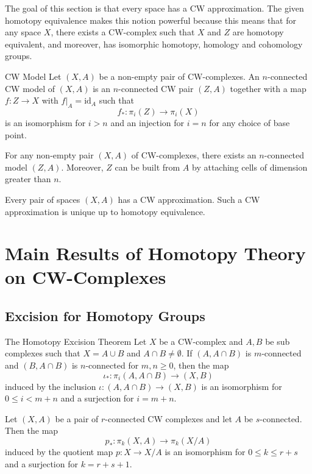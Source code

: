\documentclass[a4paper]{article}
\begin{document}
The goal of this section is that every space has a CW approximation. The given homotopy equivalence makes this notion powerful because this means that for any space $X$, there exists a CW-complex such that $X$ and $Z$ are homotopy equivalent, and moreover, has isomorphic homotopy, homology and cohomology groups. 

\begin{defn}{CW Model}{} Let $(X,A)$ be a non-empty pair of CW-complexes. An $n$-connected CW model of $(X,A)$ is an $n$-connected CW pair $(Z,A)$ together with a map $f:Z\to X$ with $f|_A=\text{id}_A$ such that $$f_\ast:\pi_i(Z)\to\pi_i(X)$$ is an isomorphism for $i>n$ and an injection for $i=n$ for any choice of base point. 
\end{defn}

\begin{thm}{}{} For any non-empty pair $(X,A)$ of CW-complexes, there exists an $n$-connected model $(Z,A)$. Moreover, $Z$ can be built from $A$ by attaching cells of dimension greater than $n$. 
\end{thm}

\begin{thm}{}{} Every pair of spaces $(X,A)$ has a CW approximation. Such a CW approximation is unique up to homotopy equivalence. 
\end{thm}

\pagebreak

\section{Main Results of Homotopy Theory on CW-Complexes}
\subsection{Excision for Homotopy Groups}
\begin{thm}{The Homotopy Excision Theorem}{} Let $X$ be a CW-complex and $A,B$ be sub complexes such that $X=A\cup B$ and $A\cap B\neq\emptyset$. If $(A,A\cap B)$ is $m$-connected and $(B,A\cap B)$ is $n$-connected for $m,n\geq 0$, then the map $$\iota_\ast:\pi_i(A,A\cap B)\to(X,B)$$ induced by the inclusion $\iota:(A,A\cap B)\to(X,B)$ is an isomorphism for $0\leq i<m+n$ and a surjection for $i=m+n$. 
\end{thm}

\begin{prp}{}{} Let $(X,A)$ be a pair of $r$-connected CW complexes and let $A$ be $s$-connected. Then the map $$p_\ast:\pi_k(X,A)\to\pi_k(X/A)$$ induced by the quotient map $p:X\to X/A$ is an isomorphism for $0\leq k\leq r+s$ and a surjection for $k=r+s+1$. 
\end{prp}
\end{document}
